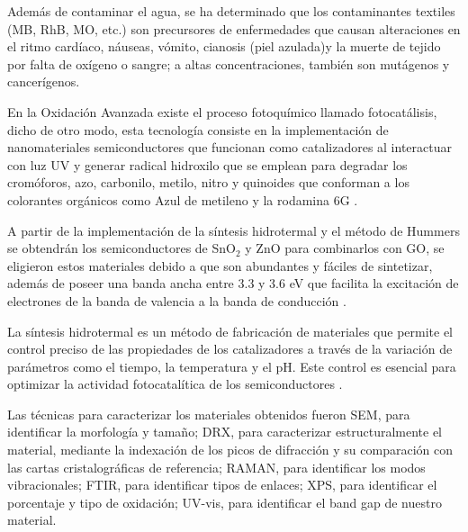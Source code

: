 \documentclass[12pt]{article}
\begin{document}
Además de contaminar el agua, se ha determinado que los contaminantes textiles (MB, RhB, MO, etc.) son precursores de enfermedades que causan alteraciones en el ritmo cardíaco, náuseas, vómito, cianosis (piel azulada)y la muerte de tejido por falta de oxígeno o sangre; a altas concentraciones, también son mutágenos y cancerígenos\cite{IEEEreferencias:Ref7,IEEEreferencias:Ref11}.
\vspace{1em} %

En la Oxidación Avanzada existe el proceso fotoquímico llamado fotocatálisis, dicho de otro modo, esta tecnología consiste en la implementación de nanomateriales semiconductores que funcionan como catalizadores al interactuar con luz UV y generar  radical hidroxilo  que se emplean para degradar los cromóforos, azo, carbonilo, metilo, nitro y quinoides que conforman a los colorantes orgánicos como Azul de metileno y la rodamina 6G \cite{IEEEreferencias:Ref5,IEEEreferencias:Ref11}.\vspace{1em}

A partir de la implementación de la síntesis hidrotermal y el método de Hummers se obtendrán los semiconductores de SnO$\displaystyle _{2}$ y ZnO para combinarlos con GO, se eligieron estos materiales debido a que son abundantes y fáciles de sintetizar, además de poseer una banda ancha entre 3.3 y 3.6 eV que facilita la excitación de electrones de la banda de valencia a la banda de conducción \cite{IEEEreferencias:Ref10,IEEEreferencias:Ref11,IEEEreferencias:Ref12,IEEEreferencias:Ref13,IEEEreferencias:Ref14,IEEEreferencias:Ref15, IEEEreferencias:Ref16, IEEEreferencias:Ref17}.\vspace{1em}

La síntesis hidrotermal es un método de fabricación de materiales que permite el control preciso de las propiedades de los catalizadores a través de la variación de parámetros como el tiempo, la temperatura y el pH. Este control es esencial para optimizar la actividad fotocatalítica de los semiconductores \cite{IEEEreferencias:Ref10}.
\vspace{1em} %

Las técnicas para caracterizar los materiales obtenidos fueron SEM, para identificar la morfología y tamaño; DRX, para caracterizar estructuralmente el material, mediante la indexación de los picos de difracción y su comparación con las cartas cristalográficas de referencia; RAMAN, para identificar los modos vibracionales; FTIR, para identificar tipos de enlaces; XPS, para identificar el porcentaje y tipo de oxidación; UV-vis, para identificar el band gap de nuestro material.\vspace{1em} %
\end{document}
